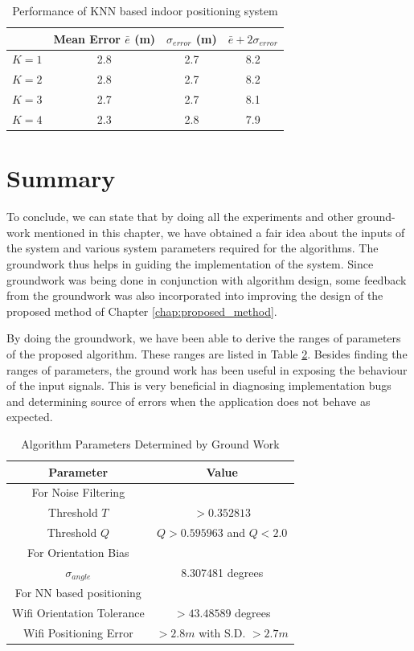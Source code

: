 \begin{table}[h]
    \centering
    \caption{Performance of KNN based indoor positioning system \label{tab:knnperf}}
    \begin{tabular}{|l|c|c|c|}
    \hline
              & Mean Error $\bar{e}$ (m) & $\sigma_{error}$ (m) & $\bar{e} + 2 \sigma_{error}$ \\
    \hline
    \hline
    $K = 1$    & 2.8 & 2.7 & 8.2 \\
    $K = 2$    & 2.8 & 2.7 & 8.2 \\
    $K = 3$    & 2.7 & 2.7 & 8.1 \\
    $K = 4$    & 2.3 & 2.8 & 7.9 \\
    \hline
    \end{tabular}

\end{table}

\section{Summary}

To conclude, we can state that by doing all the experiments and other 
ground-work mentioned in this chapter, we have obtained a fair idea 
about the inputs of the system and various system parameters required
for the algorithms. The groundwork thus helps in guiding the implementation of
the system. Since groundwork was being done in conjunction with algorithm
design, some feedback from the groundwork was also incorporated into improving
the design of the proposed method of Chapter \ref{chap:proposed_method}.

By doing the groundwork, we have been able to derive the ranges of parameters of 
the proposed algorithm. These ranges are listed in Table \ref{tbl:algo_params}.
Besides finding the ranges of parameters, the ground work has been useful 
in exposing the behaviour of the input signals. This is very beneficial 
in diagnosing implementation bugs and determining source of errors when 
the application does not behave as expected.

\begin{table}
\centering
\begin{tabular}{c c}
\hline
\hline
Parameter & Value\\
\hline
For Noise Filtering & \\
Threshold $T$ & $> 0.352813$\\
Threshold $Q$ & $Q > 0.595963$ and $Q < 2.0$\\
\hline
For Orientation Bias & \\
$\sigma_{angle}$ & 8.307481 degrees\\
\hline
For NN based positioning & \\
Wifi Orientation Tolerance & $> 43.48589$ degrees\\
Wifi Positioning Error & $> 2.8 m$ with S.D. $> 2.7 m$\\
\hline
\end{tabular}
\caption{Algorithm Parameters Determined by Ground Work\label{tbl:algo_params}}
\end{table}

